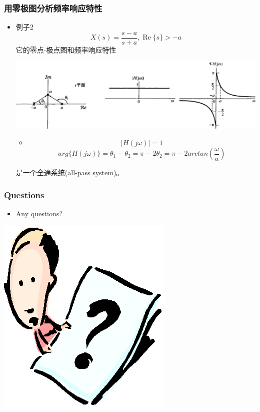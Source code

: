 \documentclass[CJKutf8,dvipsnames,table]{beamer}
\begin{document}
\begin{CJK*}{UTF8}{song}
  \begin{frame}
    \frametitle{用零极图分析频率响应特性}
    \begin{itemize}
    \item 例子2   
\[
X(s)=\frac{s-a}{s+a}, \operatorname{Re}\{s\} > -a
\]
它的零点-极点图和频率响应特性
    \begin{center}
      \includegraphics[scale=.22]{ss-c-f9-21}
    \end{center}
    	\begin{itemize}
    	\item 
    	\[
    	|H(j\omega)| = 1
    	\]
    	\[    
    	arg\{ H(j\omega) \}= \theta_1 - \theta_2 = \pi - 2\theta_2 = \pi - 2arctan(\frac{\omega}{a})
    	\]
    	\end{itemize}
	是一个全通系统(all-pass system)。
    \end{itemize}     
  \end{frame}     
    
  \begin{frame}
    \frametitle{Questions}
    \begin{itemize}
    \item Any questions?
    \end{itemize}
    \begin{center}
      \includegraphics[scale=.5]{question}
    \end{center}
  \end{frame}  
  

\end{CJK*}
\end{document}
